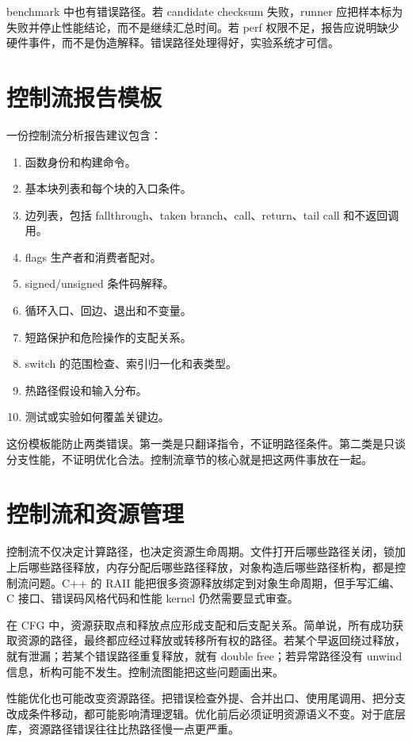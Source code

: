 benchmark 中也有错误路径。若 candidate checksum 失败，runner 应把样本标为失败并停止性能结论，而不是继续汇总时间。若 perf 权限不足，报告应说明缺少硬件事件，而不是伪造解释。错误路径处理得好，实验系统才可信。

\section{控制流报告模板}

一份控制流分析报告建议包含：

\begin{enumerate}
  \item 函数身份和构建命令。
  \item 基本块列表和每个块的入口条件。
  \item 边列表，包括 fallthrough、taken branch、call、return、tail call 和不返回调用。
  \item flags 生产者和消费者配对。
  \item signed/unsigned 条件码解释。
  \item 循环入口、回边、退出和不变量。
  \item 短路保护和危险操作的支配关系。
  \item switch 的范围检查、索引归一化和表类型。
  \item 热路径假设和输入分布。
  \item 测试或实验如何覆盖关键边。
\end{enumerate}

这份模板能防止两类错误。第一类是只翻译指令，不证明路径条件。第二类是只谈分支性能，不证明优化合法。控制流章节的核心就是把这两件事放在一起。

\section{控制流和资源管理}

控制流不仅决定计算路径，也决定资源生命周期。文件打开后哪些路径关闭，锁加上后哪些路径释放，内存分配后哪些路径释放，对象构造后哪些路径析构，都是控制流问题。C++ 的 RAII 能把很多资源释放绑定到对象生命周期，但手写汇编、C 接口、错误码风格代码和性能 kernel 仍然需要显式审查。

在 CFG 中，资源获取点和释放点应形成支配和后支配关系。简单说，所有成功获取资源的路径，最终都应经过释放或转移所有权的路径。若某个早返回绕过释放，就有泄漏；若某个错误路径重复释放，就有 double free；若异常路径没有 unwind 信息，析构可能不发生。控制流图能把这些问题画出来。

性能优化也可能改变资源路径。把错误检查外提、合并出口、使用尾调用、把分支改成条件移动，都可能影响清理逻辑。优化前后必须证明资源语义不变。对于底层库，资源路径错误往往比热路径慢一点更严重。

